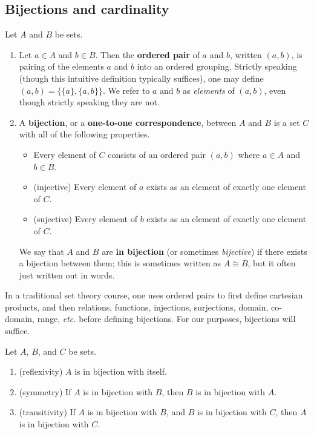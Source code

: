 \subsection{Bijections and cardinality}
\begin{definition} \label{def:bijection} Let $A$ and $B$ be sets.
\begin{enumerate}
    \item Let $a\in A$ and $b\in B$.  Then the \textbf{ordered pair} of $a$ and $b$, written $(a, b)$, is pairing of the elements $a$ and $b$ into an ordered grouping.  Strictly speaking (though this intuitive definition typically suffices), one may define $(a, b)=\{\{a\}, \{a, b\}\}$.  We refer to $a$ and $b$ as \textit{elements} of $(a,b)$, even though strictly speaking they are not.
    \item A \textbf{bijection}, or a \textbf{one-to-one correspondence}, between $A$ and $B$ is a set $C$ with all of the following properties.
    \begin{itemize}
        \item Every element of $C$ consists of an ordered pair $(a,b)$ where $a \in A$ and $b \in B$.
        \item (injective) Every element of $a$ exists as an element of exactly one element of $C$.
        \item (sujective) Every element of $b$ exists as an element of exactly one element of $C$.
    \end{itemize}
    We say that $A$ and $B$ are \textbf{in bijection} (or sometimes \textit{bijective}) if there exists a bijection between them; this is sometimes written as $A \cong B$, but it often just written out in words.
\end{enumerate}
\end{definition}

\begin{remark} In a traditional set theory course, one uses ordered pairs to first define cartesian products, and then relations, functions, injections, surjections, domain, co-domain, range, \textit{etc.} before defining bijections. For our purposes, bijections will suffice.
\end{remark}

\begin{theorem} Let $A$, $B$, and $C$ be sets.
\begin{enumerate}
    \item (reflexivity) $A$ is in bijection with itself.
    \item (symmetry) If $A$ is in bijection with $B$, then $B$ is in bijection with $A$.
    \item (transitivity) If $A$ is in bijection with $B$, and $B$ is in bijection with $C$, then $A$ is in bijection with $C$.
\end{enumerate}\end{theorem}

